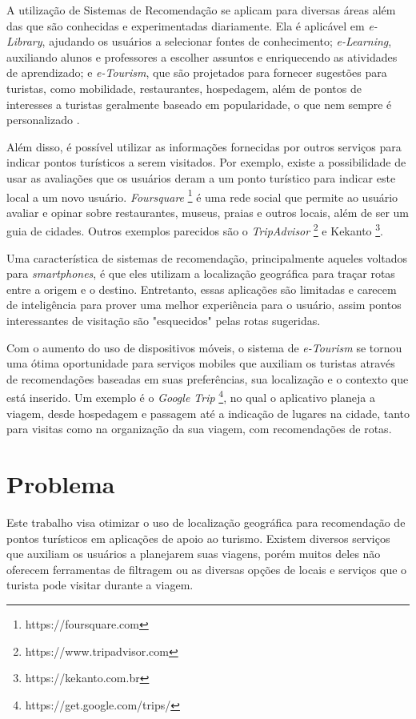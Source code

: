 A utilização de Sistemas de Recomendação se aplicam para diversas áreas além das que são conhecidas e experimentadas diariamente. Ela é aplicável em \textit{e-Library}, ajudando os usuários a selecionar fontes de conhecimento; \textit{e-Learning}, auxiliando alunos e professores a escolher assuntos e enriquecendo as atividades de aprendizado; e \textit{e-Tourism}, que são projetados para fornecer sugestões para turistas, como mobilidade, restaurantes, hospedagem, além de pontos de interesses a turistas geralmente baseado em popularidade, o que nem sempre é personalizado \citep{Singh2015}.

Além disso, é possível utilizar as informações fornecidas por outros serviços para indicar pontos turísticos a serem visitados. Por exemplo, existe a possibilidade de usar as avaliações que os usuários deram a um ponto turístico para indicar este local a um novo usuário.
\textit{Foursquare} \footnote{https://foursquare.com} é uma rede social que permite ao usuário avaliar e opinar sobre restaurantes, museus, praias e outros locais, além de ser um guia de cidades. Outros exemplos parecidos são o \textit{TripAdvisor} \footnote{https://www.tripadvisor.com} e Kekanto \footnote{https://kekanto.com.br}.

Uma característica de sistemas de recomendação, principalmente aqueles voltados para \textit{smartphones}, é que eles utilizam a localização geográfica para traçar rotas entre a origem e o destino. Entretanto, essas aplicações são limitadas e carecem de inteligência para prover uma melhor experiência para o usuário, assim pontos interessantes de visitação são "esquecidos" pelas rotas sugeridas.

Com o aumento do uso de dispositivos móveis, o sistema de \textit{e-Tourism} se tornou uma ótima oportunidade para serviços mobiles que auxiliam os turistas através de recomendações baseadas em suas preferências, sua localização e o contexto que está inserido. Um exemplo é o \textit{Google Trip} \footnote{https://get.google.com/trips/}, no qual o aplicativo planeja a viagem, desde hospedagem e passagem até a indicação de lugares na cidade, tanto para visitas como na organização da sua viagem, com recomendações de rotas.
\newline

\section{Problema}
\label{sec:problemIntroduction}

Este trabalho visa otimizar o uso de localização geográfica para recomendação de pontos turísticos em aplicações de apoio ao turismo.
Existem diversos serviços que auxiliam os usuários a planejarem suas viagens, porém muitos deles não oferecem ferramentas de filtragem ou as diversas opções de locais e serviços que o turista pode visitar durante a viagem.

